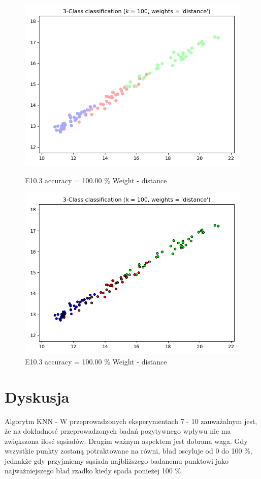 \documentclass{classrep}
\begin{document}
\begin{figure}[H]
\begin{minipage}{0.5\linewidth}
				\includegraphics[scale=0.25]{KNN_seed_10_11.png}
				\caption{E10.3 accuracy = 100.00 \% Weight - distance}
				\label{E10.3}
			\end{minipage}
			\begin{minipage}{0.5\linewidth}
				\centering
				\includegraphics[scale=0.25]{KNN_seed_10_12.png}
				\caption{E10.3 accuracy = 100.00 \% Weight - distance}
				\label{E10.3}
			\end{minipage}
		\end{figure}
		\FloatBarrier
			

\section{Dyskusja}
Algorytm KNN - W przeprowadzonych eksperymentach 7 - 10 zauważalnym jest, że na dokładnosć przeprowadzonych badań pozytywnego wpływu nie ma zwiększona ilosć sąsiadów. Drugim ważnym aspektem jest dobrana waga. Gdy wszystkie punkty zostaną potraktowane na równi, bład oscyluje od 0 do 100 \%, jednakże gdy przyjmiemy sąsiada najbliższego badanemu punktowi jako najważniejszego bład rzadko kiedy spada ponieżej 100 \%
\end{document}
